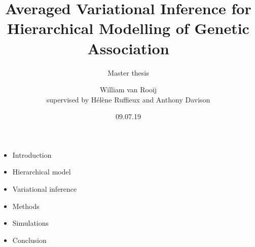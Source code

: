 \documentclass{beamer}
\begin{document}
\SetEndCharOfAlgoLine{}

\title{Averaged Variational Inference for Hierarchical Modelling of Genetic Association}
\subtitle{Master thesis}
\author{William van Rooij\\
{\small supervised by Hélène Ruffieux and Anthony Davison}}
\date{09.07.19}
\maketitle
\begin{frame}
\begin{itemize}
\item Introduction
\item Hierarchical model
\item Variational inference
\item Methods
\item Simulations
\item Conclusion
\end{itemize}
\end{frame}
\end{document}
